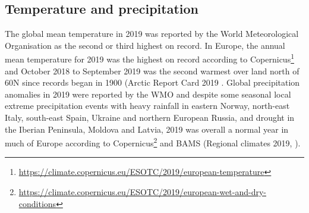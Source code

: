 \subsection{Temperature and precipitation}
The global mean temperature in 2019 was reported by the World Meteorological Organisation \citep{WMO1248:2020} as the second or third highest on record. In Europe, the annual mean temperature for 2019 was the highest on record according to Copernicus\footnote{\url{https://climate.copernicus.eu/ESOTC/2019/european-temperature}} and October 2018 to September 2019 was the second warmest over land north of 60\degrees N since records began in 1900 (Arctic Report Card 2019 \citealt{Overland:ARC2019}.
Global precipitation anomalies in 2019 were reported by the WMO \citep{WMO1248:2020} and despite some seasonal local extreme precipitation events with heavy rainfall in eastern Norway, north-east Italy, south-east Spain, Ukraine and northern European Russia, and drought in the Iberian Peninsula, Moldova and Latvia, 2019 was overall a normal year in much of Europe according to Copernicus\footnote{\url{https://climate.copernicus.eu/ESOTC/2019/european-wet-and-dry-conditions}} and BAMS (Regional climates 2019, \citealt{Bissolli:2020}).

